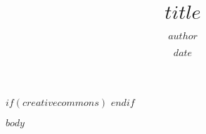 \documentclass[$fontsize$]{article}
\author{$author$}
\title{$title$}
\date{$date$}
\begin{document}
\maketitle

$if(creativecommons)$
\doclicenseThis
$endif$

\thispagestyle{empty}
\tableofcontents
\setcounter{page}{0}
\clearpage

$body$

\end{document}
